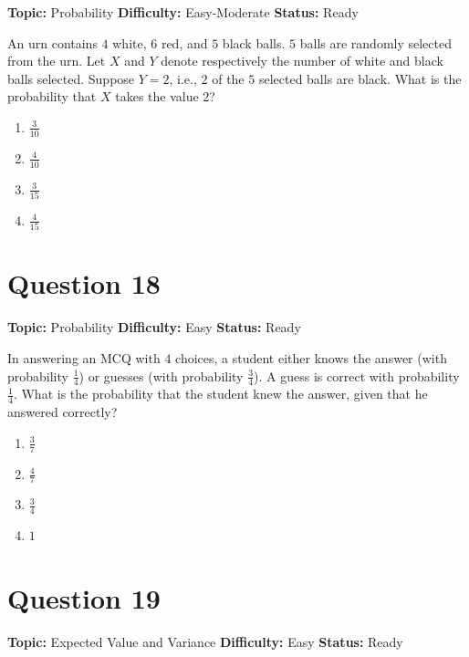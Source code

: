 \documentclass[11pt]{article}
\begin{document}

\noindent\textbf{Topic:} Probability \quad \textbf{Difficulty:} Easy-Moderate \quad \textbf{Status:} Ready



An urn contains $4$ white, $6$ red, and $5$ black balls. $5$ balls are randomly selected from the urn. Let $X$ and $Y$ denote respectively the number of white and black balls selected. Suppose $Y=2$, i.e., $2$ of the $5$ selected balls are black. What is the probability that $X$ takes the value $2$?
\begin{enumerate}[label=(\Alph*)]
\item $\tfrac{3}{10}$
\item $\tfrac{4}{10}$
\item $\tfrac{3}{15}$
\item $\tfrac{4}{15}$
\end{enumerate}

\newpage

\section*{Question 18}


\noindent\textbf{Topic:} Probability \quad \textbf{Difficulty:} Easy \quad \textbf{Status:} Ready



In answering an MCQ with $4$ choices, a student either knows the answer (with probability $\tfrac14$) or guesses (with probability $\tfrac34$). A guess is correct with probability $\tfrac14$. What is the probability that the student knew the answer, given that he answered correctly?
\begin{enumerate}[label=(\Alph*)]
\item $\tfrac{3}{7}$
\item $\tfrac{4}{7}$
\item $\tfrac{3}{4}$
\item $1$
\end{enumerate}

\newpage

\section*{Question 19}


\noindent\textbf{Topic:} Expected Value and Variance \quad \textbf{Difficulty:} Easy \quad \textbf{Status:} Ready
\end{document}

